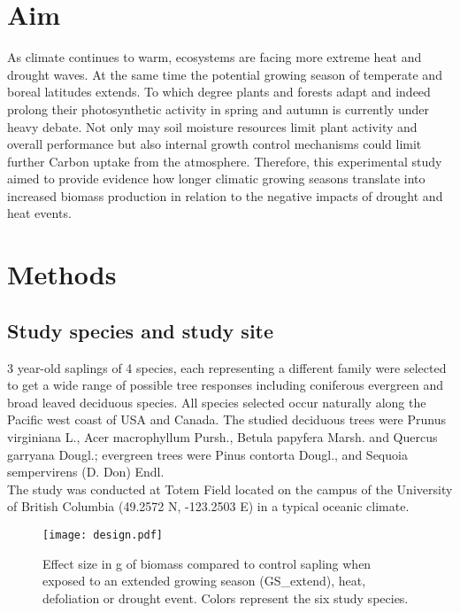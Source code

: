 \documentclass{article}
\begin{document}
	\renewcommand{\bibname}{References}%
	
	
	
	
	\date{\today}
	
	\section*{Aim}
	As climate continues to warm, ecosystems are facing more extreme heat and drought waves. At the same time the potential growing season of temperate and boreal latitudes extends. To which degree plants and forests adapt and indeed prolong their photosynthetic activity in spring and autumn is currently under heavy debate. Not only may soil moisture resources limit plant activity and overall performance but also internal growth control mechanisms could limit further Carbon uptake from the atmosphere. Therefore, this experimental study aimed to provide evidence how longer climatic growing seasons translate into increased biomass production in relation to the negative impacts of drought and heat events. 
	
	\section*{Methods}
	\subsection*{Study species and study site}
	3 year-old saplings of 4 species, each representing a different family were selected to get a wide range of possible tree responses including coniferous evergreen and broad leaved deciduous species. All species selected occur naturally along the Pacific west coast of USA and Canada. The studied deciduous trees were Prunus virginiana L., Acer macrophyllum Pursh., Betula papyfera Marsh. and Quercus garryana Dougl.; evergreen trees were Pinus contorta Dougl., and Sequoia sempervirens (D. Don) Endl. \\
	
	The study was conducted at Totem Field located on the campus of the University of British Columbia (49.2572 N, -123.2503 E) in a typical oceanic climate. 
	
		\begin{figure}
		\centering
		\texttt{[image: design.pdf]} 
		\caption{Effect size in g of biomass compared to control sapling when exposed to an extended growing season (GS\_extend), heat, defoliation or drought event. Colors represent the six study species. }
		\label{fig:fig_1xxx}
	\end{figure}
	
\end{document}
